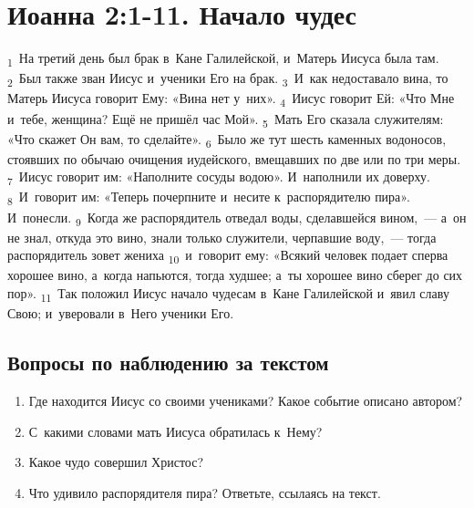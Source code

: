 \documentclass[a4paper,12pt]{article}
\begin{document}

\section{Иоанна 2:1-11. Начало чудес}

\textsubscript{1}~На третий день был брак в~Кане Галилейской, и~Матерь Иисуса была там.
\textsubscript{2}~Был также зван Иисус и~ученики Его на брак.
\textsubscript{3}~И~как недоставало вина, то Матерь Иисуса говорит Ему: «Вина нет у~них».
\textsubscript{4}~Иисус говорит Ей: «Что Мне и~тебе, женщина? Ещё не пришёл час Мой».
\textsubscript{5}~Мать Его сказала служителям: «Что скажет Он вам, то сделайте».
\textsubscript{6}~Было же тут шесть каменных водоносов, стоявших по обычаю очищения иудейского, вмещавших по две или по три меры.
\textsubscript{7}~Иисус говорит им: «Наполните сосуды водою». И~наполнили их доверху.
\textsubscript{8}~И~говорит им: «Теперь почерпните и~несите к~распорядителю пира». И~понесли.
\textsubscript{9}~Когда же распорядитель отведал воды, сделавшейся вином,~--- а~он не знал, откуда это вино, знали только служители, черпавшие воду,~--- тогда распорядитель зовет жениха
\textsubscript{10}~и~говорит ему: «Всякий человек подает сперва хорошее вино, а~когда напьются, тогда худшее; а~ты хорошее вино сберег до сих пор».
\textsubscript{11}~Так положил Иисус начало чудесам в~Кане Галилейской и~явил славу Свою; и~уверовали в~Него ученики Его.

\subsection*{Вопросы по наблюдению за текстом}
\begin{enumerate}
    \item Где находится Иисус со своими учениками? Какое событие описано автором? 
    
    \myline
    
    \myline
    \item С~какими словами мать Иисуса обратилась к~Нему? 
    
    \myline
    
    \myline
    \item Какое чудо совершил Христос? 
    
    \myline
    
    \myline
    \item Что удивило распорядителя пира? Ответьте, ссылаясь на текст.

    \myline
    
    \myline
\end{enumerate}
\end{document}
